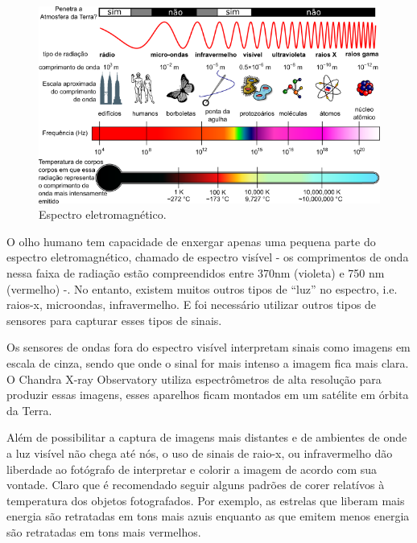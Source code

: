 \documentclass[
	article,			%
	12pt,				%
	oneside,			%
	a4paper,			%
	english,			%
	brazil,				%
	sumario=tradicional
	]{abntex2}
\begin{document}
\begin{figure}[h]
	\includegraphics[width=\linewidth]{img/espectro.png}
	\caption{Espectro eletromagnético.}
	\label{fig:esel}
	\centering
\end{figure}

O olho humano tem capacidade de enxergar apenas uma pequena parte do espectro
eletromagnético, chamado de espectro visível - os comprimentos de onda nessa
faixa de radiação estão compreendidos entre 370nm (violeta) e 750 nm (vermelho)
-. No entanto, existem muitos outros tipos de ``luz'' no espectro, i.e. raios-x,
microondas, infravermelho. E foi necessário utilizar outros tipos de sensores
para capturar esses tipos de sinais.

Os sensores de ondas fora do espectro visível interpretam sinais como imagens em
escala de cinza, sendo que onde o sinal for mais intenso a imagem fica mais
clara. O Chandra X-ray Observatory utiliza espectrômetros de alta resolução para
produzir essas imagens, esses aparelhos ficam montados em um satélite em órbita
da Terra. \cite{scienceinstruments}

Além de possibilitar a captura de imagens mais distantes e de ambientes de onde
a luz visível não chega até nós, o uso de sinais de raio-x, ou infravermelho dão
liberdade ao fotógrafo de interpretar e colorir a imagem de acordo com sua
vontade. Claro que é recomendado seguir alguns padrões de corer relatívos à
temperatura dos objetos fotografados. Por exemplo, as estrelas que liberam mais
energia são retratadas em tons mais azuis enquanto as que emitem menos energia
são retratadas em tons mais vermelhos. \cite{temperatura}


% 
\end{document}
